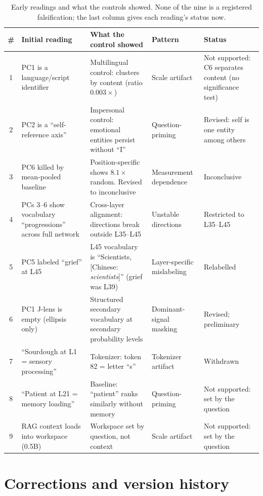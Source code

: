 \documentclass[11pt,a4paper]{article}
\begin{document}
\begin{table}[H]
\centering
\caption{Early readings and what the controls showed. None of the nine is a registered falsification; the last column gives each reading's status now.}
\label{tab:falsified}
\small
\begin{tabular}{cp{2.9cm}p{4.5cm}p{2.3cm}p{2.7cm}}
\toprule
\# & Initial reading & What the control showed & Pattern & Status \\
\midrule
1 & PC1 is a language/script identifier & Multilingual control: clusters by content (ratio $0.003\times$) & Scale artifact & Not supported: C6 separates content (no significance test) \\
2 & PC2 is a ``self-reference axis'' & Impersonal control: emotional entities persist without ``I'' & Question-priming & Revised: self is one entity among others \\
3 & PC6 killed by mean-pooled baseline & Position-specific shows $8.1\times$ random. Revised to inconclusive & Measurement dependence & Inconclusive \\
4 & PCs 3--6 show vocabulary ``progressions'' across full network & Cross-layer alignment: directions break outside L35--L45 & Unstable directions & Restricted to L35--L45 \\
5 & PC5 labeled ``grief'' at L45 & L45 vocabulary is ``Scientists, [Chinese: \textit{scientists}]'' (grief was L39) & Layer-specific mislabeling & Relabelled \\
6 & PC1 J-lens is empty (ellipsis only) & Structured secondary vocabulary at secondary probability levels & Dominant-signal masking & Revised; preliminary \\
7 & ``Sourdough at L1 = sensory processing'' & Tokenizer: token 82 = letter ``s'' & Tokenizer artifact & Withdrawn \\
8 & ``Patient at L21 = memory loading'' & Baseline: ``patient'' ranks similarly without memory & Question-priming & Not supported: set by the question \\
9 & RAG context loads into workspace (0.5B) & Workspace set by question, not context & Scale artifact & Not supported: set by the question \\
\bottomrule
\end{tabular}
\end{table}

\section{Corrections and version history}
\label{app:corrections}
\end{document}
